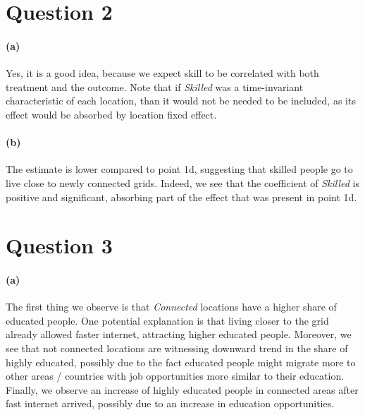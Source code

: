 \documentclass{scrartcl}
\begin{document}

\section*{Question 2}

\paragraph*{(a)}
Yes, it is a good idea, because we expect skill to be correlated with both treatment and the outcome. Note that if \textit{Skilled} was a time-invariant characteristic of each location, than it would not be needed to be included, as its effect would be absorbed by location fixed effect. 

\paragraph*{(b)}
The estimate is lower compared to point 1d, suggesting that skilled people go to live close to newly connected grids. Indeed, we see that the coefficient of \textit{Skilled} is positive and significant, absorbing part of the effect that was present in point 1d.

\section*{Question 3}

\paragraph*{(a)}
The first thing we observe is that \textit{Connected} locations have a higher share of educated people. One potential explanation is that living closer to the grid already allowed faster internet, attracting higher educated people. Moreover, we see that not connected locations are witnessing downward trend in the share of highly educated, possibly due to the fact educated people might migrate more to other areas / countries with job opportunities more similar to their education. Finally, we observe an increase of highly educated people in connected areas after fast internet arrived, possibly due to an increase in education opportunities.  
\end{document}
